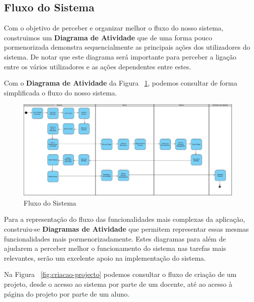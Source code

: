 \subsection{Fluxo do Sistema}

Com o objetivo de perceber e organizar melhor o fluxo do nosso sistema, construimos um \textbf{Diagrama de Atividade} que de uma forma pouco pormenorizada demonstra sequencialmente as principais ações dos utilizadores do sistema. De notar que este diagrama será importante para perceber a ligação entre os vários utilizadores e as ações dependentes entre estes.

Com o \textbf{Diagrama de Atividade} da Figura ~\ref{fig:diagrama-blocos}, podemos consultar de forma simplificada o fluxo do nosso sistema.

\begin{figure}[H] 
  \centering
  \includegraphics[width=1\textwidth,center]{images/arquitetura/diagrama-blocos}
  \caption{Fluxo do Sistema}
  \label{fig:diagrama-blocos}
\end{figure}

Para a representação do fluxo das funcionalidades mais complexas da aplicação, construiu-se \textbf{Diagramas de Atividade} que permitem representar essas mesmas funcionalidades mais pormenorizadamente.
Estes diagramas para além de ajudarem a perceber melhor o funcionamento do sistema nas tarefas mais relevantes, serão um excelente apoio na implementação do sistema.

Na Figura ~\ref{fig:criacao-projecto} podemos consultar o fluxo de criação de um projeto, desde o acesso ao sistema por parte de um docente, até ao acesso à página do projeto por parte de um aluno.

